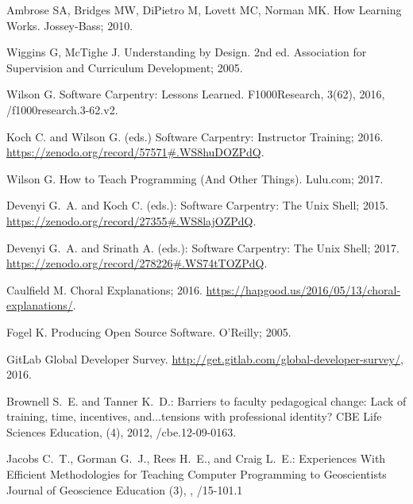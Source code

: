 \documentclass[10pt,letterpaper]{article}
\begin{document}
\begin{thebibliography}{1}

Ambrose SA, Bridges MW, DiPietro M, Lovett MC, Norman MK.
\newblock How Learning Works.
\newblock Jossey-Bass; 2010.

Wiggins G, McTighe J.
\newblock Understanding by Design.
\newblock 2nd ed. Association for Supervision and Curriculum Development; 2005.

Wilson G.
\newblock Software Carpentry: Lessons Learned.
\newblock F1000Research, 3(62), 2016,
/f1000research.3-62.v2.

Koch C. and Wilson G. (eds.)
\newblock Software Carpentry: Instructor Training; 2016.
\newblock \url{https://zenodo.org/record/57571#.WS8huDOZPdQ}.

Wilson G.
\newblock How to Teach Programming (And Other Things).
\newblock Lulu.com; 2017.

Devenyi G.~A. and Koch C. (eds.):
Software Carpentry: The Unix Shell; 2015.
\newblock \url{https://zenodo.org/record/27355#.WS8lajOZPdQ}.

Devenyi G.~A. and Srinath A. (eds.):
Software Carpentry: The Unix Shell; 2017.
\newblock \url{https://zenodo.org/record/278226#.WS74tTOZPdQ}.

Caulfield M. Choral Explanations; 2016.
\newblock \url{https://hapgood.us/2016/05/13/choral-explanations/}.

Fogel K.
\newblock Producing Open Source Software.
\newblock O'Reilly; 2005.

GitLab
\newblock Global Developer Survey.
\newblock \url{http://get.gitlab.com/global-developer-survey/}, 2016.

Brownell S.~E. and Tanner K.~D.:
Barriers to faculty pedagogical change: Lack of training, time, incentives, and...tensions with professional identity?
\newblock CBE Life Sciences Education,
(4), 2012,
/cbe.12-09-0163.

Jacobs C.~T., Gorman G.~J., Rees H.~E., and Craig L.~E.:
Experiences With Efficient Methodologies for Teaching Computer Programming to Geoscientists
\newblock Journal of Geoscience Education
(3),
,
/15-101.1

\end{thebibliography}
\end{document}
